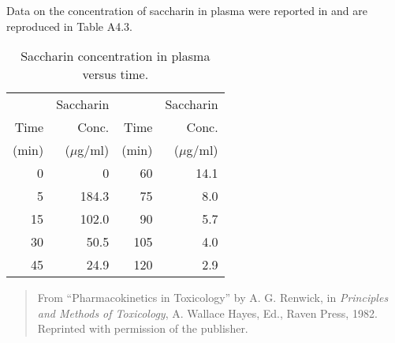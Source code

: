 Data on the concentration of saccharin in plasma were reported in
 and are reproduced in Table A4.3.
\begin{table}
  \caption{\label{atbl:A4sac2}
    Saccharin concentration in plasma versus time.}
  \begin{center}
    \begin{tabular}{ r r r r}
      \hline
      &Saccharin&&Saccharin\\
      Time&Conc.&Time&Conc.\\
      (min)&($\mu$g/ml)&(min)&($\mu$g/ml)\\ \hline
      0&0&60&14.1\\
      5&184.3&75&8.0 \\
      15&102.0&90&5.7 \\
      30&50.5&105&4.0\\
      45&24.9&120&2.9\\ \hline
    \end{tabular}
  \end{center}
  \begin{quote}
    From ``Pharmacokinetics in Toxicology'' by A. G. Renwick, in {\em
      Principles and Methods of Toxicology}, A. Wallace Hayes, Ed.,
    Raven Press, 1982.  Reprinted with permission of the publisher.
  \end{quote}
\end{table}

